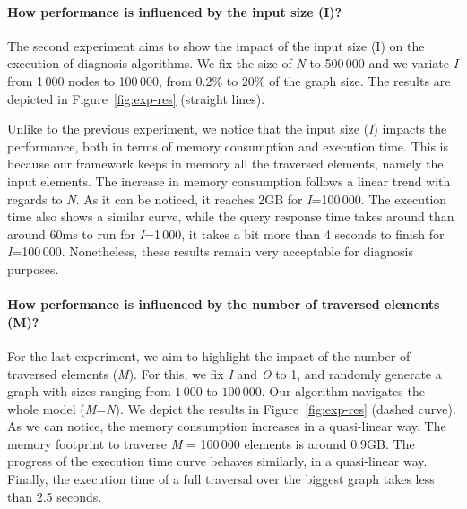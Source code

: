 \paragraph{How performance is influenced by the input size (I)?}
The second experiment aims to show the impact of the input size (I) on the execution of diagnosis algorithms. We fix the size of \textit{N} to 500\,000 and we variate \textit{I} from 1\,000 nodes to 100\,000, \ie from 0.2\% to 20\% of the graph size. 
The results are depicted in Figure~\ref{fig:exp-res} (straight lines).

Unlike to the previous experiment, we notice that the input size (\textit{I}) impacts the performance, both in terms of memory consumption and execution time. This is because our framework keeps in memory all the traversed elements, namely the input elements.
The increase in memory consumption follows a linear trend with regards to \textit{N}. As it can be noticed, it reaches 2GB for \textit{I}=100\,000. The execution time also shows a similar curve, while the query response time takes around than around 60ms to run for \textit{I}=1\,000, it takes a bit more than 4 seconds to finish for \textit{I}=100\,000. Nonetheless, these results remain very acceptable for diagnosis purposes. 

\paragraph{How performance is influenced by the number of traversed elements (M)?}%
For the last experiment, we aim to highlight the impact of the number of traversed elements (\textit{M}). For this, we fix \textit{I} and \textit{O} to 1, and randomly generate a graph with sizes ranging from $1\,000$ to $100\,000$. Our algorithm navigates the whole model (\textit{M}=\textit{N}).
We depict the results in Figure~\ref{fig:exp-res} (dashed curve).
As we can notice, the memory consumption increases in a quasi-linear way. The memory footprint to traverse \textit{M} = 100\,000 elements is around 0.9GB. The progress of the execution time curve behaves similarly, in a quasi-linear way. Finally, the execution time of a full traversal over the biggest graph takes less than 2.5 seconds. 

